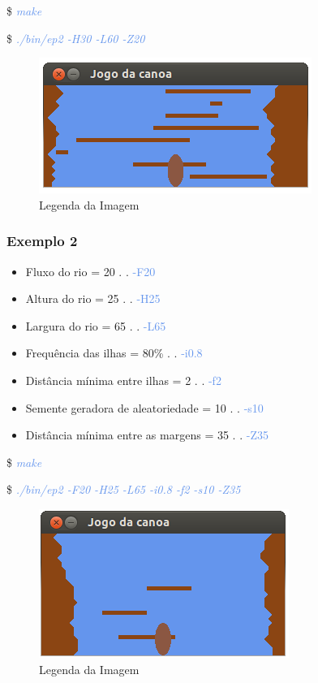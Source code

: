 \documentclass[a4paper,12pt]{article}
\begin{document}
    \$ \textcolor{CornflowerBlue}{\textit{make}}
    
    \$ \textcolor{CornflowerBlue}{\textit{./bin/ep2 -H30 -L60 -Z20}}
  
    \bigskip
    
\begin{figure}[h]
     \includegraphics[scale=1]{im1.png}
     \caption{Legenda da Imagem}
\end{figure}
  
  \newpage %
    \subsubsection{\textcolor{NavyBlue}{Exemplo 2}}
    
    \begin{itemize}
    \bigskip
    
    \item Fluxo do rio = 20  . . \textcolor{CornflowerBlue}{-F20}  
    \item Altura do rio = 25  . . \textcolor{CornflowerBlue}{-H25}
    \item Largura do rio = 65  . . \textcolor{CornflowerBlue}{-L65}
    \item Frequência das ilhas = 80\%  . . \textcolor{CornflowerBlue}{-i0.8}
    \item Distância mínima entre ilhas = 2  . . \textcolor{CornflowerBlue}{-f2}
    \item Semente geradora de aleatoriedade = 10  . . \textcolor{CornflowerBlue}{-s10}
    \item Distância mínima entre as margens = 35  . . \textcolor{CornflowerBlue}{-Z35}
    
    \end{itemize}  
    \bigskip
    
    \$ \textcolor{CornflowerBlue}{\textit{make}}
    
    \$ \textcolor{CornflowerBlue}{\textit{./bin/ep2 -F20 -H25 -L65 -i0.8 -f2 -s10 -Z35}}
    
    \bigskip

  \begin{figure}[h]
     \includegraphics[scale=1]{im2.png}
     \caption{Legenda da Imagem}
\end{figure}
\end{document}
